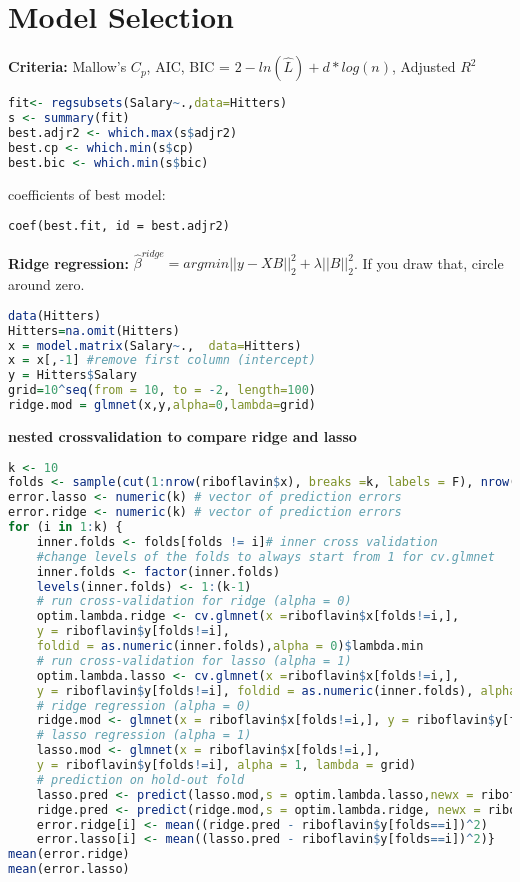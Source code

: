 \section{Model Selection}
\textbf{Criteria: } Mallow's $C_p$, AIC, BIC = $2-ln(\hat L) + d*log(n)$, Adjusted $R^2$
\begin{lstlisting}[language =R]
fit<- regsubsets(Salary~.,data=Hitters)
s <- summary(fit)
best.adjr2 <- which.max(s$adjr2)
best.cp <- which.min(s$cp)
best.bic <- which.min(s$bic)
\end{lstlisting}
coefficients of best model:
\begin{lstlisting}
coef(best.fit, id = best.adjr2)
\end{lstlisting}
\textbf{Ridge regression: } $\hat\beta^{ridge} = argmin ||y-XB||_2^2+ \lambda||B||_2^2$. If you draw that, circle around zero. 
\begin{lstlisting}[language=R]
data(Hitters)
Hitters=na.omit(Hitters)
x = model.matrix(Salary~.,  data=Hitters)
x = x[,-1] #remove first column (intercept)
y = Hitters$Salary
grid=10^seq(from = 10, to = -2, length=100)
ridge.mod = glmnet(x,y,alpha=0,lambda=grid)
\end{lstlisting}
\textbf{nested crossvalidation to compare ridge and lasso}
\begin{lstlisting}[language =R]
k <- 10
folds <- sample(cut(1:nrow(riboflavin$x), breaks =k, labels = F), nrow(riboflavin$x), replace = F)
error.lasso <- numeric(k) # vector of prediction errors
error.ridge <- numeric(k) # vector of prediction errors
for (i in 1:k) {
	inner.folds <- folds[folds != i]# inner cross validation
	#change levels of the folds to always start from 1 for cv.glmnet
	inner.folds <- factor(inner.folds)
	levels(inner.folds) <- 1:(k-1)
	# run cross-validation for ridge (alpha = 0)
	optim.lambda.ridge <- cv.glmnet(x =riboflavin$x[folds!=i,],
	y = riboflavin$y[folds!=i],
	foldid = as.numeric(inner.folds),alpha = 0)$lambda.min
	# run cross-validation for lasso (alpha = 1)
	optim.lambda.lasso <- cv.glmnet(x =riboflavin$x[folds!=i,],
	y = riboflavin$y[folds!=i], foldid = as.numeric(inner.folds), alpha = 1)$lambda.min
	# ridge regression (alpha = 0)
	ridge.mod <- glmnet(x = riboflavin$x[folds!=i,], y = riboflavin$y[folds!=i], alpha = 0, lambda = grid)
	# lasso regression (alpha = 1)
	lasso.mod <- glmnet(x = riboflavin$x[folds!=i,],
	y = riboflavin$y[folds!=i], alpha = 1, lambda = grid)
	# prediction on hold-out fold
	lasso.pred <- predict(lasso.mod,s = optim.lambda.lasso,newx = riboflavin$x[folds==i,])
	ridge.pred <- predict(ridge.mod,s = optim.lambda.ridge, newx = riboflavin$x[folds==i,])
	error.ridge[i] <- mean((ridge.pred - riboflavin$y[folds==i])^2)
	error.lasso[i] <- mean((lasso.pred - riboflavin$y[folds==i])^2)}
mean(error.ridge)
mean(error.lasso)
\end{lstlisting}

